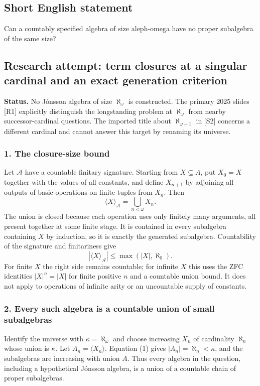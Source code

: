 \documentclass[11pt,a4paper]{article}
\begin{document}
\subsection{Short English statement}

Can a countably specified algebra of size aleph-omega have no proper subalgebra of the same size?

\subsection{Research attempt: term closures at a singular cardinal and an exact generation criterion}
\textbf{Status.} No Jónsson algebra of size $\aleph_\omega$ is constructed. The primary 2025 slides [R1] explicitly distinguish the longstanding problem at $\aleph_\omega$ from nearby successor-cardinal questions. The imported title about $\aleph_{\omega+1}$ in [S2] concerns a different cardinal and cannot answer this target by renaming its universe.

\subsubsection{1. The closure-size bound}
Let $\mathcal A$ have a countable finitary signature. Starting from $X\subseteq A$, put $X_0=X$ together with the values of all constants, and define $X_{n+1}$ by adjoining all outputs of basic operations on finite tuples from $X_n$. Then
\[\langle X\rangle_{\mathcal A}=\bigcup_{n<\omega}X_n.
\]
The union is closed because each operation uses only finitely many arguments, all present together at some finite stage. It is contained in every subalgebra containing $X$ by induction, so it is exactly the generated subalgebra. Countability of the signature and finitariness give
\[|\langle X\rangle_{\mathcal A}|\leq\max(|X|,\aleph_0).\tag{1}\]
For finite $X$ the right side remains countable; for infinite $X$ this uses the ZFC identities $|X|^n=|X|$ for finite positive $n$ and a countable union bound. It does not apply to operations of infinite arity or an uncountable supply of constants.

\subsubsection{2. Every such algebra is a countable union of small subalgebras}
Identify the universe with $\kappa=\aleph_\omega$ and choose increasing $X_n$ of cardinality $\aleph_n$ whose union is $\kappa$. Let $A_n=\langle X_n\rangle$. Equation (1) gives $|A_n|=\aleph_n<\kappa$, and the subalgebras are increasing with union $A$. Thus every algebra in the question, including a hypothetical Jónsson algebra, is a union of a countable chain of proper subalgebras.
\end{document}

